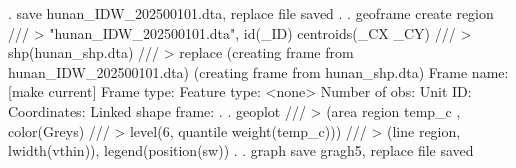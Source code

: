 {\smallskip}
. save hunan_IDW_202500101.dta, replace
file{} saved
{\smallskip}
. 
. geoframe create region ///
>     "hunan_IDW_202500101.dta", id(_ID) centroids(_CX _CY) ///
>     shp(hunan_shp.dta) ///
>     replace
(creating frame {} from hunan_IDW_202500101.dta)
(creating frame {} from hunan_shp.dta)
{\smallskip}
            Frame name: {} [make current]
            Frame type: {}
          Feature type: <none>
         Number of obs: {}
               Unit ID: {}
           Coordinates: {}
    Linked shape frame: {}
{\smallskip}
. 
. geoplot ///
>     (area region temp_c , color(Greys) ///
>                 level(6, quantile weight(temp_c))) ///
>     (line region, lwidth(vthin)), legend(position(sw))
{\smallskip}
. 
. graph save gragh5, replace
file {} saved
